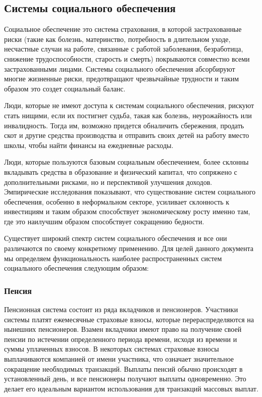 \subsection{Системы социального обеспечения}
Социальное обеспечение это система страхования, в которой застрахованные риски (такие как болезнь, материнство, потребность в длительном уходе, несчастные случаи на работе, связанные с работой заболевания, безработица, снижение трудоспособности, старость и смерть) покрываются совместно всеми застрахованными лицами. Системы социального обеспечения абсорбируют многие жизненные риски, предотвращают чрезвычайные трудности и таким образом это создет социальный баланс. 

Люди, которые не имеют доступа к системам социального обеспечения, рискуют стать нищими, если их постигнет судьба, такая как болезнь, неурожайность или инвалидность. Тогда им, возможно придется обналичить сбережения, продать скот и другие средства производства и отправить своих детей на работу вместо школы, чтобы найти финансы на ежедневные расходы. \cite{erd}

Люди, которые пользуются базовым социальным обеспечением, более склонны вкладывать средства в образование и физический капитал, что сопряжено с дополнительными рисками, но и  перспективой улучшения доходов. Эмпирические исследования показывают, что существование систем социального обеспечения, особенно в неформальном секторе, усиливает склонность к инвестициям и таким образом способствует экономическому росту именно там, где это наилучшим образом способствует сокращению бедности. \cite{hcms}

Существует широкий спектр систем социального обеспечения и все они различаются по своему конкретному применению. Для целей данного документа мы определяем функциональность наиболее распространенных систем социального обеспечения следующим образом:

\subsubsection*{Пенсия}
Пенсионная система состоит из ряда вкладчиков и пенсионеров. Участники системы платят ежемесячные страховые взносы, которые перераспределяются на нынешних пенсионеров. Взамен вкладчики имеют право на получение своей пенсии по истечении определенного периода времени, исходя из времени и суммы уплаченных взносов. В некоторых системах страховые взносы выплачиваются компанией от имени участника, что означает значительное сокращение необходимых транзакций.
Выплаты пенсий обычно происходят в установленный день, и все пенсионеры получают выплаты одновременно. Это делает его идеальным вариантом использования для транзакций массовых выплат.

